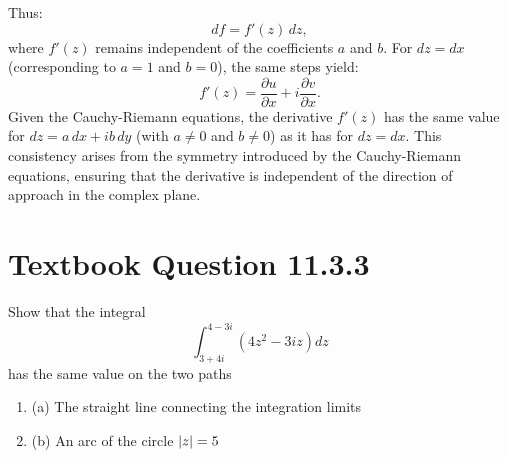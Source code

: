 \documentclass[12pt]{article}
\begin{document}
        Thus:
        \[
        df = f'(z) \, dz,
        \]
        where \(f'(z)\) remains independent of the coefficients \(a\) and \(b\).
        For \(dz = dx\) (corresponding to \(a = 1\) and \(b = 0\)), the same steps yield:
        \[
        f'(z) = \frac{\partial u}{\partial x} + i \frac{\partial v}{\partial x}.
        \]
        Given the Cauchy-Riemann equations, the derivative \(f'(z)\) has the same value for \(dz = a \, dx + i b \, dy\) (with \(a \neq 0\) and \(b \neq 0\)) as it has for \(dz = dx\). This consistency arises from the symmetry introduced by the Cauchy-Riemann equations, ensuring that the derivative is independent of the direction of approach in the complex plane.
        

\section*{Textbook Question 11.3.3}
    Show that the integral
    \[
        \int_{3 + 4 i}^{4 - 3 i} (4 z^2 - 3 i z) dz
    \]
    has the same value on the two paths
    \begin{enumerate}
        \item (a) The straight line connecting the integration limits
        \item (b) An arc of the circle $\abs{z} = 5$
    \end{enumerate}
   
\end{document}
